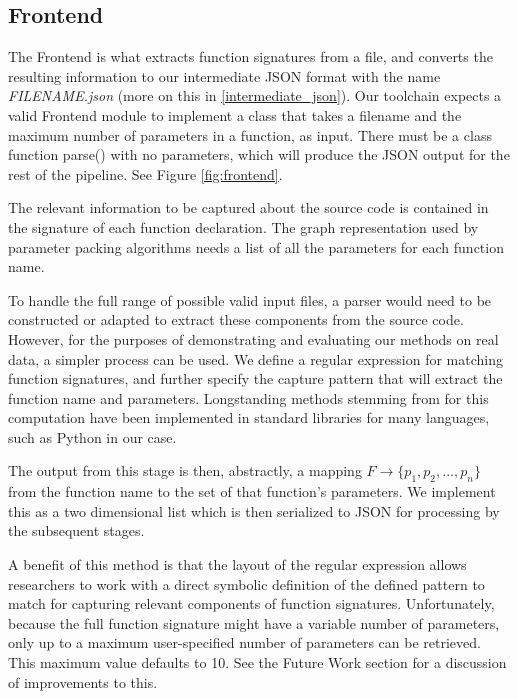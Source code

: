 \documentclass{article}
\begin{document}
\subsection{Frontend}

\noindent The Frontend is what extracts function signatures from a file, and converts the resulting information to our intermediate JSON format with the name \textit{FILENAME.json} (more on this in \ref{intermediate_json}). Our toolchain expects a valid Frontend module to implement a class that takes a filename and the maximum number of parameters in a function, as input. There must be a class function parse() with no parameters, which will produce the JSON output for the rest of the pipeline. See Figure \ref{fig:frontend}.
\newline\newline

The relevant information to be captured about the source code is contained in the signature of each function declaration. The graph representation used by parameter packing algorithms needs a list of all the parameters for each function name.

To handle the full range of possible valid input files, a parser would need to be constructed or adapted to extract these components from the source code. However, for the purposes of demonstrating and evaluating our methods on real data, a simpler process can be used. We define a regular expression for matching function signatures, and further specify the capture pattern that will extract the function name and parameters. Longstanding methods stemming from \cite{10.1145/363347.363387} for this computation have been implemented in standard libraries for many languages, such as Python in our case.

The output from this stage is then, abstractly, a mapping $F \to \{ p_1, p_2, ..., p_n \}$ from the function name to the set of that function's parameters. We implement this as a two dimensional list which is then serialized to JSON for processing by the subsequent stages.

A benefit of this method is that the layout of the regular expression allows researchers to work with a direct symbolic definition of the defined pattern to match for capturing relevant components of function signatures. Unfortunately, because the full function signature might have a variable number of parameters, only up to a maximum user-specified number of parameters can be retrieved. This maximum value defaults to 10. See the Future Work section for a discussion of improvements to this.
\end{document}
